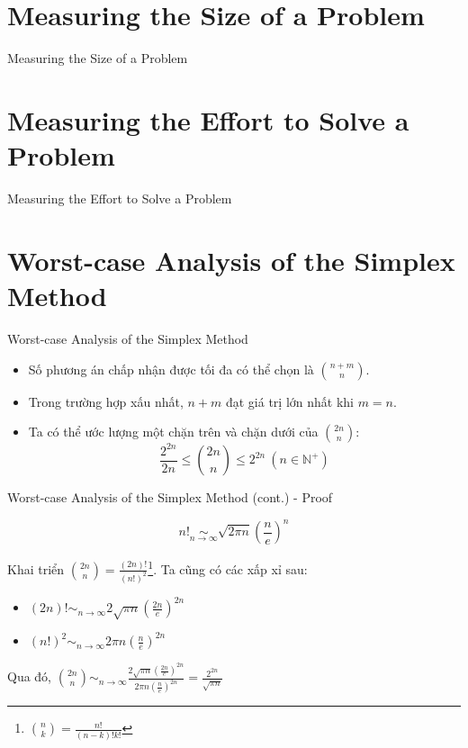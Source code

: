 \documentclass[10pt]{beamer}
\begin{document}
\section{Measuring the Size of a Problem}
\begin{frame}{Measuring the Size of a Problem}

\end{frame}

\section{Measuring the Effort to Solve a Problem}
\begin{frame}{Measuring the Effort to Solve a Problem}

\end{frame}

\section{Worst-case Analysis of the Simplex Method}
\begin{frame}{Worst-case Analysis of the Simplex Method}
\begin{itemize}
\item Số phương án chấp nhận được tối đa có thể chọn là $\displaystyle \binom{n + m}{n}$.
\item Trong trường hợp xấu nhất, $n + m$ đạt giá trị lớn nhất khi $m = n$.
\item Ta có thể ước lượng một chặn trên và chặn dưới của $\displaystyle \binom{2n}{n}$\cite{Vanderbei2020}:
$$
\frac{2^{2n}}{2n} \leq \binom{2n}{n} \leq 2^{2n} \ (n \in \mathbb{N^+})
$$
\end{itemize}
\end{frame}
\begin{frame}{Worst-case Analysis of the Simplex Method (cont.) - Proof}
\begin{theorem}
$$
\displaystyle
n! \operatorname*{\sim}_{n\to\infty} \sqrt{2\pi n}\left(\frac{n}{e}\right)^n
$$
\end{theorem}
Khai triển $\displaystyle \binom{2n}{n} = \frac{(2n)!}{(n!)^2}$\footnote{$\binom{n}{k} = \frac{n!}{(n - k)!k!}$}. Ta cũng có các xấp xỉ sau:
\begin{itemize}
\item $\displaystyle (2n)! \operatorname*{\sim}_{n\to\infty} 2\sqrt{\pi n} \left(\frac{2n}{e}\right)^{2n}$ 
\item $\displaystyle (n!)^2 \operatorname*{\sim}_{n\to\infty} 2\pi n \left(\frac{n}{e}\right)^{2n}$ 
\end{itemize}
Qua đó, $\displaystyle \binom{2n}{n} \operatorname*{\sim}_{n\to\infty} \frac{2\sqrt{\pi n} \left(\frac{2n}{e}\right)^{2n}}{2\pi n \left(\frac{n}{e}\right)^{2n}} =  \frac{2^{2n}}{\sqrt{\pi n}}$
\end{frame}
\end{document}
